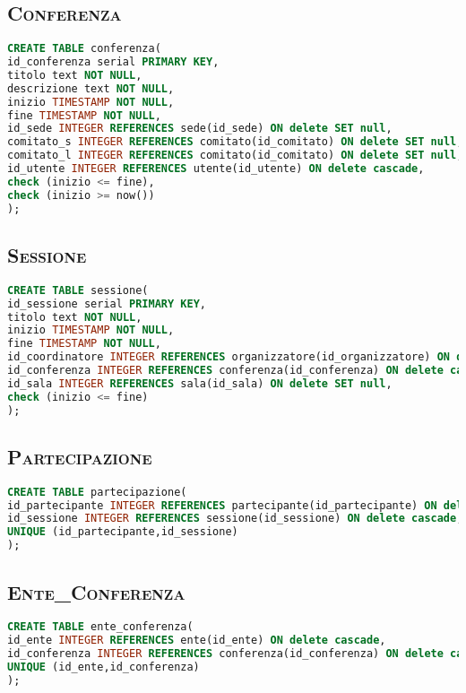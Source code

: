 \subsection{\textsc{Conferenza}}
\begin{lstlisting}[language=SQL,style=mystyle, caption={Tabella: Conferenza}]
CREATE TABLE conferenza(
id_conferenza serial PRIMARY KEY,
titolo text NOT NULL,
descrizione text NOT NULL,
inizio TIMESTAMP NOT NULL,
fine TIMESTAMP NOT NULL,
id_sede INTEGER REFERENCES sede(id_sede) ON delete SET null,
comitato_s INTEGER REFERENCES comitato(id_comitato) ON delete SET null,
comitato_l INTEGER REFERENCES comitato(id_comitato) ON delete SET null,
id_utente INTEGER REFERENCES utente(id_utente) ON delete cascade,
check (inizio <= fine), 
check (inizio >= now()) 
);
\end{lstlisting}
\subsection{\textsc{Sessione}}
\begin{lstlisting}[language=SQL,style=mystyle, caption={Tabella: Sessione}]
CREATE TABLE sessione(
id_sessione serial PRIMARY KEY,
titolo text NOT NULL,
inizio TIMESTAMP NOT NULL,
fine TIMESTAMP NOT NULL,
id_coordinatore INTEGER REFERENCES organizzatore(id_organizzatore) ON delete SET null,
id_conferenza INTEGER REFERENCES conferenza(id_conferenza) ON delete cascade,
id_sala INTEGER REFERENCES sala(id_sala) ON delete SET null,
check (inizio <= fine)
);
\end{lstlisting}
\subsection{\textsc{Partecipazione}}
\begin{lstlisting}[language=SQL,style=mystyle, caption={Tabella: Partecipazione}]
CREATE TABLE partecipazione(
id_partecipante INTEGER REFERENCES partecipante(id_partecipante) ON delete cascade,
id_sessione INTEGER REFERENCES sessione(id_sessione) ON delete cascade,
UNIQUE (id_partecipante,id_sessione) 
);
\end{lstlisting}
\subsection{\textsc{Ente\_Conferenza}}
\begin{lstlisting}[language=SQL,style=mystyle, caption={Tabella: Ente\_Conferenza}]
CREATE TABLE ente_conferenza(
id_ente INTEGER REFERENCES ente(id_ente) ON delete cascade,
id_conferenza INTEGER REFERENCES conferenza(id_conferenza) ON delete cascade,
UNIQUE (id_ente,id_conferenza)
);
\end{lstlisting}
